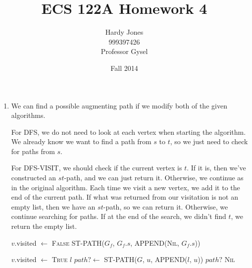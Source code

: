 \documentclass[12pt,letterpaper]{article}
\title{ECS 122A Homework 4\vspace{-2ex}}
\author{Hardy Jones\\
        999397426\\
        Professor Gysel\vspace{-2ex}}
\date{Fall 2014}
\begin{document}
  \maketitle

  \begin{enumerate}
    \item

      We can find a possible augmenting path if we modify both of the given algorithms.

      For DFS, we do not need to look at each vertex when starting the algorithm.
      We already know we want to find a path from $s$ to $t$, so we just need to check for paths from $s$.

      For DFS-VISIT, we should check if the current vertex is $t$.
      If it is, then we've constructed an $st$-path, and we can just return it.
      Otherwise, we continue as in the original algorithm.
      Each time we visit a new vertex, we add it to the end of the current path.
      If what was returned from our visitation is not an empty list,
      then we have an $st$-path, so we can return it.
      Otherwise, we continue searching for paths.
      If at the end of the search, we didn't find $t$, we return the empty list.

      \begin{algorithm}
        \begin{algorithmic}
              \State $v$.visited $\gets$ \textsc{False}
            \EndFor
            \State \Return ST-PATH($G_f$, $G_f.s$, APPEND(\textsc{Nil}, $G_f.s$))
          \EndFunction
        \end{algorithmic}
      \end{algorithm}

      \begin{algorithm}
        \begin{algorithmic}
            \State $v$.visited $\gets$ \textsc{True}
              \State \Return $l$
            \EndIf
                \State $path? \gets$ ST-PATH($G$, $u$, APPEND($l$, $u$))
                  \State \Return $path?$
                \EndIf
              \EndIf
            \EndFor
            \State \Return \textsc{Nil}
          \EndFunction
        \end{algorithmic}
      \end{algorithm}


\end{enumerate}
\end{document}

